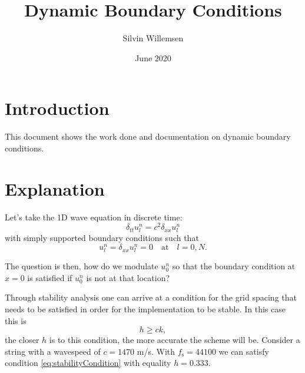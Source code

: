 \documentclass[dvipsnames]{article}
\title{Dynamic Boundary Conditions}
\author{Silvin Willemsen}
\date{June 2020}
\begin{document}
\maketitle

\section{Introduction}
This document shows the work done and documentation on dynamic boundary conditions.

\section{Explanation}
Let's take the 1D wave equation in discrete time:
\begin{equation}
    \delta_{tt}u_l^n=c^2\delta_{xx}u_l^n
\end{equation}
with simply supported boundary conditions such that
\begin{equation}
u_l^n = \delta_{xx}u_l^n = 0 \quad \text{at} \quad l = 0, N.
\end{equation}




The question is then, how do we modulate $u_0^n$ so that the boundary condition at $x=0$ is satisfied if $u_0^n$ is not at that location?

Through stability analysis one can arrive at a condition for the grid spacing that needs to be satisfied in order for the implementation to be stable. In this case this is
\begin{equation}\label{eq:stabilityCondition}
    h \geq ck,
\end{equation}
the closer $h$ is to this condition, the more accurate the scheme will be. 
Consider a string with a wavespeed of $c = 1470$ m/s. With $f_\text{s} = 44100$ we can satisfy condition \eqref{eq:stabilityCondition} with equality $h = 0.333$.
\end{document}
